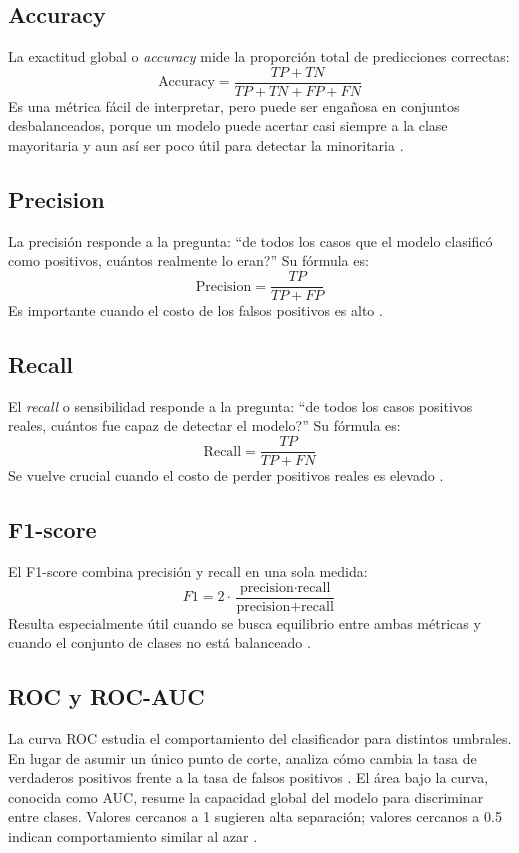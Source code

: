 \documentclass[12pt]{article}
\begin{document}
\subsection{Accuracy}
La exactitud global o \textit{accuracy} mide la proporción total de predicciones correctas:
\[
\text{Accuracy} = \frac{TP + TN}{TP + TN + FP + FN}
\]
Es una métrica fácil de interpretar, pero puede ser engañosa en conjuntos desbalanceados, porque un modelo puede acertar casi siempre a la clase mayoritaria y aun así ser poco útil para detectar la minoritaria \cite{google_class_metrics}.

\subsection{Precision}
La precisión responde a la pregunta: ``de todos los casos que el modelo clasificó como positivos, cuántos realmente lo eran?'' Su fórmula es:
\[
\text{Precision} = \frac{TP}{TP + FP}
\]
Es importante cuando el costo de los falsos positivos es alto \cite{google_class_metrics,google_metrics_glossary}.

\subsection{Recall}
El \textit{recall} o sensibilidad responde a la pregunta: ``de todos los casos positivos reales, cuántos fue capaz de detectar el modelo?'' Su fórmula es:
\[
\text{Recall} = \frac{TP}{TP + FN}
\]
Se vuelve crucial cuando el costo de perder positivos reales es elevado \cite{google_class_metrics}.

\subsection{F1-score}
El F1-score combina precisión y recall en una sola medida:
\[
F1 = 2 \cdot \frac{\text{precision} \cdot \text{recall}}{\text{precision} + \text{recall}}
\]
Resulta especialmente útil cuando se busca equilibrio entre ambas métricas y cuando el conjunto de clases no está balanceado \cite{google_class_metrics}.

\subsection{ROC y ROC-AUC}
La curva ROC estudia el comportamiento del clasificador para distintos umbrales. En lugar de asumir un único punto de corte, analiza cómo cambia la tasa de verdaderos positivos frente a la tasa de falsos positivos \cite{gcp_roc_curve,google_thresholding}. El área bajo la curva, conocida como AUC, resume la capacidad global del modelo para discriminar entre clases. Valores cercanos a 1 sugieren alta separación; valores cercanos a 0.5 indican comportamiento similar al azar \cite{google_metrics_glossary}.
\end{document}
